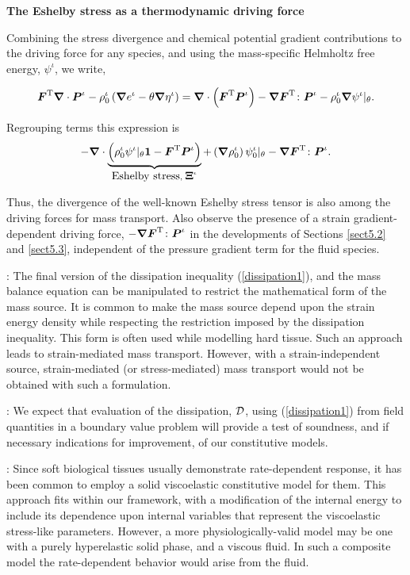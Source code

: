 {\bf The Eshelby stress as a thermodynamic driving force}
\label{eshelby-force}

Combining the stress divergence and chemical potential gradient
contributions to the driving force for any species, and using the
mass-specific Helmholtz free energy, $\psi^\iota$, we write,

\begin{equation}
\mbox{\boldmath$ F$}^\mathrm{T}\mbox{\boldmath$\nabla$}\cdot\mbox{\boldmath$ P$}^\iota - \rho^\iota_0\left(\mbox{\boldmath$\nabla$}
e^\iota - \theta\mbox{\boldmath$\nabla$}\eta^\iota\right) =
\mbox{\boldmath$\nabla$}\cdot\left(\mbox{\boldmath$ F$}^\mathrm{T}\mbox{\boldmath$ P$}^\iota\right) -
\mbox{\boldmath$\nabla$}\mbox{\boldmath$ F$}^\mathrm{T}\colon\mbox{\boldmath$ P$}^\iota
 - \rho^\iota_0\mbox{\boldmath$\nabla$}\psi^\iota\vert_\theta.
\end{equation}

\noindent Regrouping terms this expression is
\begin{equation}
-\mbox{\boldmath$\nabla$}\cdot\underbrace{\left(\rho^\iota_0\psi^\iota\vert_\theta{\bf 1}
- \mbox{\boldmath$ F$}^\mathrm{T}\mbox{\boldmath$ P$}^\iota\right)}_{\mbox{Eshelby
stress},\;\mbox{\boldmath$\Xi$}^\iota} +
\left(\mbox{\boldmath$\nabla$}\rho^\iota_0\right)\psi^\iota_0\vert_\theta -
\mbox{\boldmath$\nabla$}\mbox{\boldmath$ F$}^\mathrm{T}\colon\mbox{\boldmath$ P$}^\iota.
\end{equation}

Thus, the divergence of the well-known Eshelby stress tensor is
also among the driving forces for mass transport. Also observe the
presence of a strain gradient-dependent driving force,
$-\mbox{\boldmath$\nabla$}\mbox{\boldmath$ F$}^\mathrm{T}\colon\mbox{\boldmath$ P$}^\iota$ in the developments of
Sections \ref{sect5.2} and \ref{sect5.3}, independent of the
pressure gradient term for the fluid species.

: The final version of the dissipation
inequality (\ref{dissipation1}), and the mass balance equation can
be manipulated to restrict the mathematical form of the mass
source. It is common to make the mass source depend upon the
strain energy density \citep{HarriganHamilton:1993} while
respecting the restriction imposed by the dissipation inequality.
This form is often used while modelling hard tissue. Such an
approach leads to strain-mediated mass transport. However, with a
strain-independent source, strain-mediated (or stress-mediated)
mass transport would not be obtained with such a formulation.

: We expect that evaluation of the
dissipation, ${\mathcal D}$, using (\ref{dissipation1}) from field
quantities in a boundary value problem will provide a test of
soundness, and if necessary indications for improvement, of our
constitutive models.

: Since soft biological tissues usually
demonstrate rate-dependent response, it has been common to employ
a solid viscoelastic constitutive model for them. This approach
fits within our framework, with a modification of the internal
energy to include its dependence upon internal variables that
represent the viscoelastic stress-like parameters. However, a more
physiologically-valid model may be one with a purely hyperelastic
solid phase, and a viscous fluid. In such a composite model the
rate-dependent behavior would arise from the fluid.

